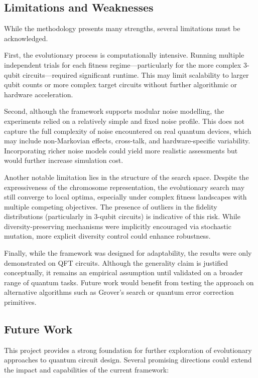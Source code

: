 \documentclass[11pt,a4paper]{article}
\begin{document}
\subsection{Limitations and Weaknesses}\label{sec:limitations}
While the methodology presents many strengths, several limitations must be acknowledged.\newline

First, the evolutionary process is computationally intensive. Running multiple independent trials for each fitness regime—particularly for the more complex 3-qubit circuits—required significant runtime. This may limit scalability to larger qubit counts or more complex target circuits without further algorithmic or hardware acceleration.\newline

Second, although the framework supports modular noise modelling, the experiments relied on a relatively simple and fixed noise profile. This does not capture the full complexity of noise encountered on real quantum devices, which may include non-Markovian effects, cross-talk, and hardware-specific variability. Incorporating richer noise models could yield more realistic assessments but would further increase simulation cost.\newline

Another notable limitation lies in the structure of the search space. Despite the expressiveness of the chromosome representation, the evolutionary search may still converge to local optima, especially under complex fitness landscapes with multiple competing objectives. The presence of outliers in the fidelity distributions (particularly in 3-qubit circuits) is indicative of this risk. While diversity-preserving mechanisms were implicitly encouraged via stochastic mutation, more explicit diversity control could enhance robustness.\newline

Finally, while the framework was designed for adaptability, the results were only demonstrated on QFT circuits. Although the generality claim is justified conceptually, it remains an empirical assumption until validated on a broader range of quantum tasks. Future work would benefit from testing the approach on alternative algorithms such as Grover's search or quantum error correction primitives.

\subsection{Future Work}
This project provides a strong foundation for further exploration of evolutionary approaches to quantum circuit design. Several promising directions could extend the impact and capabilities of the current framework:
\end{document}
